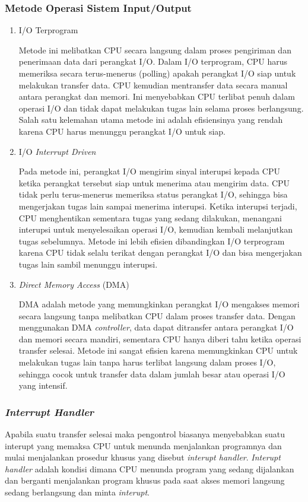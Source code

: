 \documentclass[12pt]{article}
\begin{document}
\subsubsection{Metode Operasi Sistem Input/Output}
\begin{enumerate}
    \item I/O Terprogram \par
    Metode ini melibatkan CPU secara langsung dalam proses pengiriman dan penerimaan data dari perangkat I/O. Dalam I/O terprogram, CPU harus memeriksa secara terus-menerus (polling) apakah perangkat I/O siap untuk melakukan transfer data. CPU kemudian mentransfer data secara manual antara perangkat dan memori. Ini menyebabkan CPU terlibat penuh dalam operasi I/O dan tidak dapat melakukan tugas lain selama proses berlangsung. Salah satu kelemahan utama metode ini adalah efisiensinya yang rendah karena CPU harus menunggu perangkat I/O untuk siap.
    \item I/O \emph{Interrupt Driven} \par
    Pada metode ini, perangkat I/O mengirim sinyal interupsi kepada CPU ketika perangkat tersebut siap untuk menerima atau mengirim data. CPU tidak perlu terus-menerus memeriksa status perangkat I/O, sehingga bisa mengerjakan tugas lain sampai menerima interupsi. Ketika interupsi terjadi, CPU menghentikan sementara tugas yang sedang dilakukan, menangani interupsi untuk menyelesaikan operasi I/O, kemudian kembali melanjutkan tugas sebelumnya. Metode ini lebih efisien dibandingkan I/O terprogram karena CPU tidak selalu terikat dengan perangkat I/O dan bisa mengerjakan tugas lain sambil menunggu interupsi.
    \item \emph{Direct Memory Access} (DMA) \par
    DMA adalah metode yang memungkinkan perangkat I/O mengakses memori secara langsung tanpa melibatkan CPU dalam proses transfer data. Dengan menggunakan DMA \emph{controller}, data dapat ditransfer antara perangkat I/O dan memori secara mandiri, sementara CPU hanya diberi tahu ketika operasi transfer selesai. Metode ini sangat efisien karena memungkinkan CPU untuk melakukan tugas lain tanpa harus terlibat langsung dalam proses I/O, sehingga cocok untuk transfer data dalam jumlah besar atau operasi I/O yang intensif.
\end{enumerate}

\subsubsection{\emph{Interrupt Handler}}
Apabila suatu transfer selesai maka pengontrol biasanya menyebabkan suatu interupt yang memaksa CPU untuk menunda menjalankan programnya dan mulai menjalankan prosedur khusus yang disebut \emph{interupt handler}. \emph{Interupt handler} adalah kondisi dimana CPU menunda program yang sedang dijalankan dan berganti menjalankan program khusus pada saat akses memori langsung sedang berlangsung dan minta \emph{interupt}.
\end{document}
